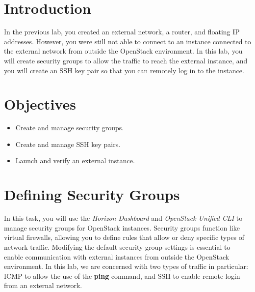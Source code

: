 \documentclass[letterpaper, 12pt]{article}
\begin{document}

\section*{Introduction}\label{sec:introduction}
In the previous lab, you created an external network, a router, and floating IP addresses.
However, you were still not able to connect to an instance connected to the external network from outside the OpenStack environment.
In this lab, you will create security groups to allow the traffic to reach the external instance, and you will create an SSH key pair so that you can remotely log in to the instance.

\section*{Objectives}\label{sec:objectives}
\begin{itemize}[itemsep=0pt]
    \item Create and manage security groups.
    \item Create and manage SSH key pairs.
    \item Launch and verify an external instance.
\end{itemize}
\clearpage

\labsettings

\section{Defining Security Groups}\label{sec:defining-security-groups}
In this task, you will use the \textit{Horizon Dashboard} and \textit{OpenStack Unified CLI} to manage security groups for OpenStack instances.
Security groups function like virtual firewalls, allowing you to define rules that allow or deny specific types of network traffic.
Modifying the default security group settings is essential to enable communication with external instances from outside the OpenStack environment.
In this lab, we are concerned with two types of traffic in particular: ICMP to allow the use of the \textbf{ping} command, and SSH to enable remote login from an external network.
\end{document}
